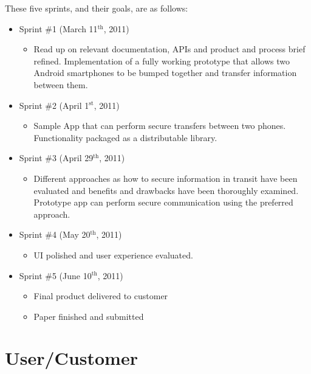 \documentclass[a4paper,11pt]{article}
\begin{document}
These five sprints, and their goals, are as follows:
\begin{itemize}
	\item Sprint \#1 (March 11$^{\text{th}}$, 2011)
	\begin{itemize}
		\item Read up on relevant documentation, APIs and product and process brief refined. Implementation of a fully working prototype that allows two Android smartphones to be bumped together and transfer information between them.
	\end{itemize}
\pagebreak
	\item Sprint \#2 (April 1$^{\text{st}}$, 2011)
	\begin{itemize}
		\item Sample App that can perform secure transfers between two phones. Functionality packaged as a distributable library.
	\end{itemize}
	
	\item Sprint \#3 (April 29$^{\text{th}}$, 2011)
	\begin{itemize}
		\item Different approaches as how to secure information in transit have been evaluated and benefits and drawbacks have been thoroughly examined. Prototype app can perform secure communication using the preferred approach.
	\end{itemize}
	
	\item Sprint \#4 (May 20$^{\text{th}}$, 2011)
	\begin{itemize}
		\item UI polished and user experience evaluated.
	\end{itemize}
	
	\item Sprint \#5 (June 10$^{\text{th}}$, 2011)
	\begin{itemize}
		\item Final product delivered to customer
		\item Paper finished and submitted
	\end{itemize}
\end{itemize}


\section{User/Customer} %
\label{sec:user_customer}
\end{document}
